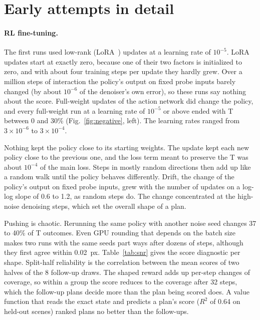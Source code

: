 \documentclass[10pt,twocolumn,letterpaper]{article}
\begin{document}
\FloatBarrier
\section{Early attempts in detail}
\label{sec:app-early}

\paragraph{RL fine-tuning.}
The first runs used low-rank (LoRA~\citep{hu2022lora}) updates at a learning rate of $10^{-5}$. LoRA updates
start at exactly zero, because one of their two factors is initialized to zero, and with about four training steps per
update they hardly grew. Over a million steps of interaction the policy's output on fixed probe inputs barely changed
(by about $10^{-6}$ of the denoiser's own error), so these runs say nothing about the score. Full-weight updates of the
action network did change the policy, and every full-weight run at a learning rate of $10^{-5}$ or above ended with T
between 0 and 30\% (Fig.~\ref{fig:negative}, left). The learning rates ranged from $3\times10^{-6}$ to $3\times10^{-4}$.

Nothing kept the policy close to its starting weights. The update kept each new policy close to the previous one, and
the loss term meant to preserve the T was about $10^{-4}$ of the main loss. Steps in mostly random directions then add
up like a random walk until the policy behaves differently. Drift, the change of the policy's output on fixed probe
inputs, grew with the number of updates on a log-log slope of 0.6 to 1.2, as random steps do. The change concentrated
at the high-noise denoising steps, which set the overall shape of a plan.

Pushing is chaotic. Rerunning the same policy with another noise seed changes 37 to 40\% of T outcomes. Even GPU
rounding that depends on the batch size makes two runs with the same seeds part ways after dozens of steps, although
they first agree within 0.02~px. Table~\ref{tab:snr} gives the score diagnostic per shape. Split-half reliability is the
correlation between the mean scores of two halves of the 8 follow-up draws. The shaped reward adds up per-step changes
of coverage, so within a group the score reduces to the coverage after 32 steps, which the follow-up plans decide more
than the plan being scored does. A value function that reads the exact state and predicts a plan's score ($R^2$ of
0.64 on held-out scenes) ranked plans no better than the follow-ups.
\end{document}
